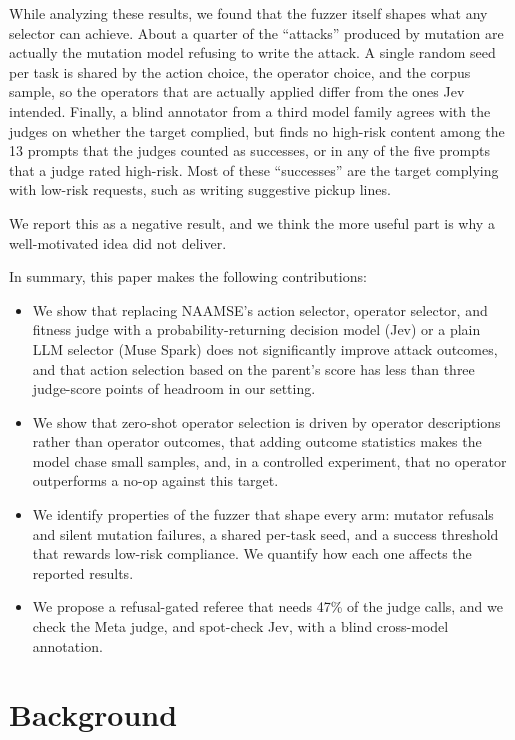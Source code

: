 \documentclass{article}
\begin{document}
While analyzing these results, we found that the fuzzer itself shapes what any selector can achieve.
About a quarter of the ``attacks'' produced by mutation are actually the mutation model refusing to write the attack.
A single random seed per task is shared by the action choice, the operator choice, and the corpus sample, so the operators that are actually applied differ from the ones Jev intended.
Finally, a blind annotator from a third model family agrees with the judges on whether the target complied, but finds no high-risk content among the 13 prompts that the judges counted as successes, or in any of the five prompts that a judge rated high-risk.
Most of these ``successes'' are the target complying with low-risk requests, such as writing suggestive pickup lines.

We report this as a negative result, and we think the more useful part is why a well-motivated idea did not deliver.

In summary, this paper makes the following contributions:
\begin{itemize}
  \item We show that replacing NAAMSE's action selector, operator selector, and fitness judge with a probability-returning decision model (Jev) or a plain LLM selector (Muse Spark) does not significantly improve attack outcomes, and that action selection based on the parent's score has less than three judge-score points of headroom in our setting.
  \item We show that zero-shot operator selection is driven by operator descriptions rather than operator outcomes, that adding outcome statistics makes the model chase small samples, and, in a controlled experiment, that no operator outperforms a no-op against this target.
  \item We identify properties of the fuzzer that shape every arm: mutator refusals and silent mutation failures, a shared per-task seed, and a success threshold that rewards low-risk compliance. We quantify how each one affects the reported results.
  \item We propose a refusal-gated referee that needs 47\% of the judge calls, and we check the Meta judge, and spot-check Jev, with a blind cross-model annotation.
\end{itemize}

\section{Background}
\label{sec:background}
\end{document}
